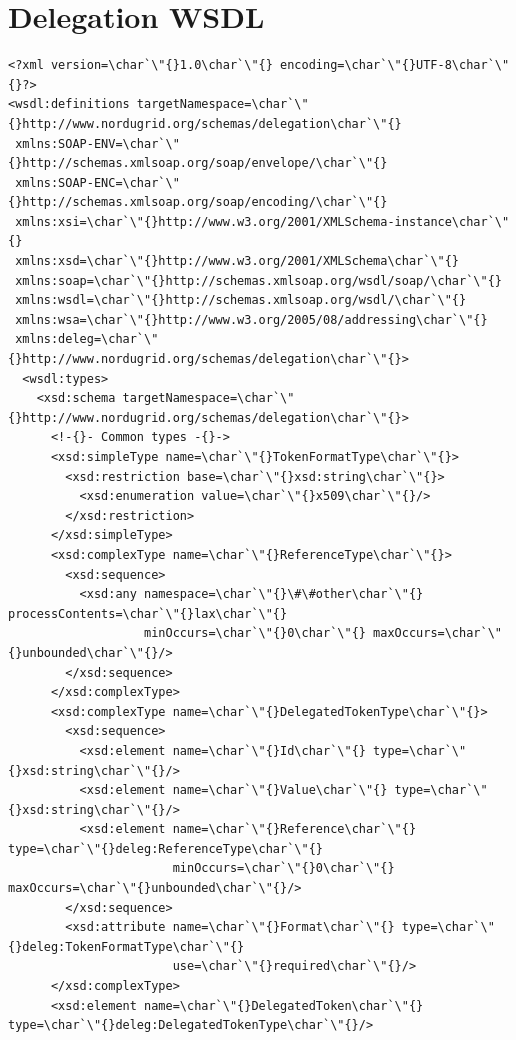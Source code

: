 \documentclass{article}                            %
\begin{document}
\section{Delegation WSDL\label{annex:delegation-wsdl}}

\begin{footnotesize}\begin{verbatim}
<?xml version=\char`\"{}1.0\char`\"{} encoding=\char`\"{}UTF-8\char`\"{}?>
<wsdl:definitions targetNamespace=\char`\"{}http://www.nordugrid.org/schemas/delegation\char`\"{}
 xmlns:SOAP-ENV=\char`\"{}http://schemas.xmlsoap.org/soap/envelope/\char`\"{}
 xmlns:SOAP-ENC=\char`\"{}http://schemas.xmlsoap.org/soap/encoding/\char`\"{}
 xmlns:xsi=\char`\"{}http://www.w3.org/2001/XMLSchema-instance\char`\"{}
 xmlns:xsd=\char`\"{}http://www.w3.org/2001/XMLSchema\char`\"{}
 xmlns:soap=\char`\"{}http://schemas.xmlsoap.org/wsdl/soap/\char`\"{}
 xmlns:wsdl=\char`\"{}http://schemas.xmlsoap.org/wsdl/\char`\"{}
 xmlns:wsa=\char`\"{}http://www.w3.org/2005/08/addressing\char`\"{}
 xmlns:deleg=\char`\"{}http://www.nordugrid.org/schemas/delegation\char`\"{}>
  <wsdl:types>
    <xsd:schema targetNamespace=\char`\"{}http://www.nordugrid.org/schemas/delegation\char`\"{}>
      <!-{}- Common types -{}->
      <xsd:simpleType name=\char`\"{}TokenFormatType\char`\"{}>
        <xsd:restriction base=\char`\"{}xsd:string\char`\"{}>
          <xsd:enumeration value=\char`\"{}x509\char`\"{}/>
        </xsd:restriction>
      </xsd:simpleType>
      <xsd:complexType name=\char`\"{}ReferenceType\char`\"{}>
        <xsd:sequence>
          <xsd:any namespace=\char`\"{}\#\#other\char`\"{} processContents=\char`\"{}lax\char`\"{}
                   minOccurs=\char`\"{}0\char`\"{} maxOccurs=\char`\"{}unbounded\char`\"{}/>
        </xsd:sequence>
      </xsd:complexType>
      <xsd:complexType name=\char`\"{}DelegatedTokenType\char`\"{}>
        <xsd:sequence>
          <xsd:element name=\char`\"{}Id\char`\"{} type=\char`\"{}xsd:string\char`\"{}/>
          <xsd:element name=\char`\"{}Value\char`\"{} type=\char`\"{}xsd:string\char`\"{}/>
          <xsd:element name=\char`\"{}Reference\char`\"{} type=\char`\"{}deleg:ReferenceType\char`\"{}
                       minOccurs=\char`\"{}0\char`\"{} maxOccurs=\char`\"{}unbounded\char`\"{}/>
        </xsd:sequence>
        <xsd:attribute name=\char`\"{}Format\char`\"{} type=\char`\"{}deleg:TokenFormatType\char`\"{}
                       use=\char`\"{}required\char`\"{}/>
      </xsd:complexType>
      <xsd:element name=\char`\"{}DelegatedToken\char`\"{} type=\char`\"{}deleg:DelegatedTokenType\char`\"{}/>

\end{verbatim}
\end{footnotesize}
\end{document}
